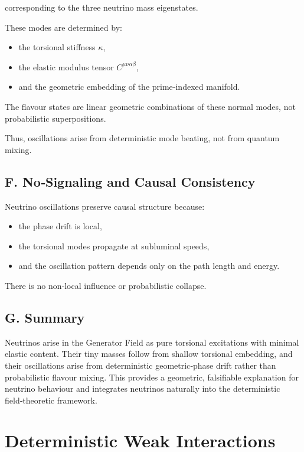 \documentclass[reprint,amsmath,amssymb,aps,prl,floatfix]{revtex4-2}
\begin{document}
corresponding to the three neutrino mass eigenstates.

These modes are determined by:
\begin{itemize}
\item the torsional stiffness \(\kappa\),  
\item the elastic modulus tensor \(C^{\mu\nu\alpha\beta}\),  
\item and the geometric embedding of the prime‑indexed manifold.
\end{itemize}

The flavour states are linear geometric combinations of these normal modes, not probabilistic superpositions.
\medskip

Thus, oscillations arise from deterministic mode beating, not from quantum mixing.

\subsection{F. No‑Signaling and Causal Consistency}

Neutrino oscillations preserve causal structure because:
\begin{itemize}
\item the phase drift is local,  
\item the torsional modes propagate at subluminal speeds,  
\item and the oscillation pattern depends only on the path length and energy.
\end{itemize}

There is no non‑local influence or probabilistic collapse.

\subsection{G. Summary}

Neutrinos arise in the Generator Field as pure torsional excitations with minimal elastic content. Their tiny masses follow from shallow torsional embedding, and their oscillations arise from deterministic geometric‑phase drift rather than probabilistic flavour mixing. This provides a geometric, falsifiable explanation for neutrino behaviour and integrates neutrinos naturally into the deterministic field‑theoretic framework.

\section{Deterministic Weak Interactions}
\end{document}
